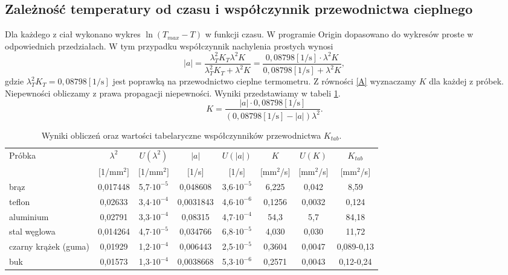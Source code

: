 \documentclass[11pt]{article}
\begin{document}
\subsection*{Zależność temperatury od czasu i współczynnik przewodnictwa cieplnego}
Dla każdego z ciał wykonano wykres $\ln (T_{max} - T)$ w funkcji czasu. W programie Origin dopasowano
do wykresów proste w odpowiednich przedziałach. W tym przypadku współczynnik nachylenia prostych
wynosi 
\begin{equation}\label{A}
|a|=\dfrac{\lambda_T^2 K_T \lambda ^2 K}{\lambda_T^2 K_T +\lambda ^2 K} = 
	\dfrac{0,08798 [1/\mbox{s}] \cdot \lambda ^2 K}{0,08798 [1/\mbox{s}] +\lambda ^2 K},
\end{equation}
gdzie $\lambda_T^2 K_T = 0,08798 [1/\mbox{s}]$ jest poprawką na przewodnictwo cieplne termometru. 
Z równości \ref{A} wyznaczamy $K$ dla każdej z próbek. Niepewności obliczamy z prawa propagacji niepewności. Wyniki przedstawiamy w tabeli \ref{TAB_K}.
\begin{equation}
K = \dfrac{|a| \cdot 0,08798 [1/\mbox{s}]}{(0,08798 [1/\mbox{s}]-|a|)\lambda^2}.
\end{equation}

\begin{table}[h!]
\begin{center}
\caption{Wyniki obliczeń oraz wartości tabelaryczne współczynników przewodnictwa $K_{tab}$.}{\label{TAB_K}}
\begin{tabular}{|l|c|c|c|c|c|c|c|}\hline
\multirow{2}{*}{Próbka} & $\lambda^2$ & $U(\lambda^2)$ & $|a|$ & $U(|a|)$ & $K$ & $U(K)$ & $K_{tab}$ \\ 
& $[$1/mm$^2]$& $[$1/mm$^2]$ & $[$1/s$]$ & $[$1/s$]$ & $[$mm$^2$/s$]$& $[$mm$^2$/s$]$& $[$mm$^2$/s$]$ \\ \hline
brąz & 0,017448& 5,7$\cdot 10^{-5}$& 0,048608& 3,6$\cdot 10^{-5}$& 6,225 & 0,042& 8,59 \\ \hline   
teflon &0,02633 & 3,4$\cdot 10^{-4}$& 0,0031843& 4,6$\cdot 10^{-6}$&0,1256& 0,0032&0,124 \\ \hline
aluminium & 0,02791&3,3$\cdot 10^{-4}$ & 0,08315& 4,7$\cdot 10^{-4}$& 54,3&5,7 &84,18\\ \hline
stal węglowa & 0,014264& 4,7$\cdot 10^{-5}$ &0,034766 & 6,8$\cdot 10^{-5}$&4,030 & 0,030& 11,72\\ \hline   
czarny krążek (guma) & 0,01929&1,2$\cdot 10^{-4}$&0,006443&2,5$\cdot 10^{-5}$&0,3604&0,0047& 0,089-0,13\\ \hline
buk &0,01573& 1,3$\cdot 10^{-4}$&0,0038668&5,3$\cdot 10^{-6}$&0,2571&0,0043& 0,12-0,24\\ \hline
\end{tabular}
\end{center}
\end{table}
\end{document}
